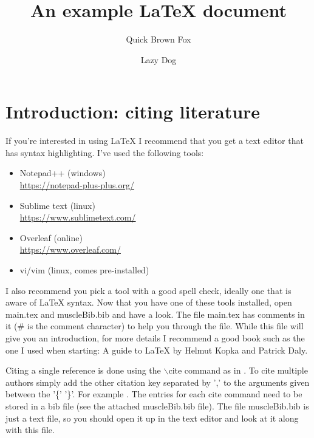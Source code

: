 \documentclass[11pt,twocolumn,a4paper]{article}
\title{An example \LaTeX{} document}
\author[1,2]{Quick Brown Fox}
\author[3]{Lazy Dog}
\affil[1]{Fox Research, Baden-W\"{u}rttemberg, Germany}
\affil[3]{Department of Dackl, Badger University, Hessen, Germany}
\affil[*]{\tt\small fantastic.fox@uni-fox.de}
\begin{document}
\linenumbers


\maketitle



\section{Introduction: citing literature}

\label{sec:intro}

If you're interested in using \LaTeX{} I recommend that you get a text editor that has syntax highlighting. I've used the following tools:
\begin{itemize}
    \item Notepad++ (windows)\\ \url{https://notepad-plus-plus.org/}
    \item Sublime text (linux)\\ \url{https://www.sublimetext.com/}
    \item Overleaf (online)\\ \url{https://www.overleaf.com/}
    \item vi/vim (linux, comes pre-installed)
\end{itemize}    
I also recommend you pick a tool with a good spell check, ideally one that is aware of \LaTeX{} syntax. Now that you have one of these tools installed, open main.tex and muscleBib.bib and have a look. The file main.tex has comments in it (\# is the comment character) to help you through the file. While this file will give you an introduction, for more details I recommend a good book such as the one I used when starting: A guide to \LaTeX{} by Helmut Kopka and Patrick Daly.

Citing a single reference is done using the $\backslash$cite command as in \cite{Trumbower2009PostureStiffness}. To cite multiple authors simply add the other citation key separated by ',' to the arguments given between the '\{' '\}'. For example \cite{KayaHiguchi2013MyosinStiffness, AbbottAubert1952:RampStretch}. The entries for each cite command need to be stored in a bib file (see the attached muscleBib.bib file). The file muscleBib.bib is just a text file, so you should open it up in the text editor and look at it along with this file.
\end{document}
